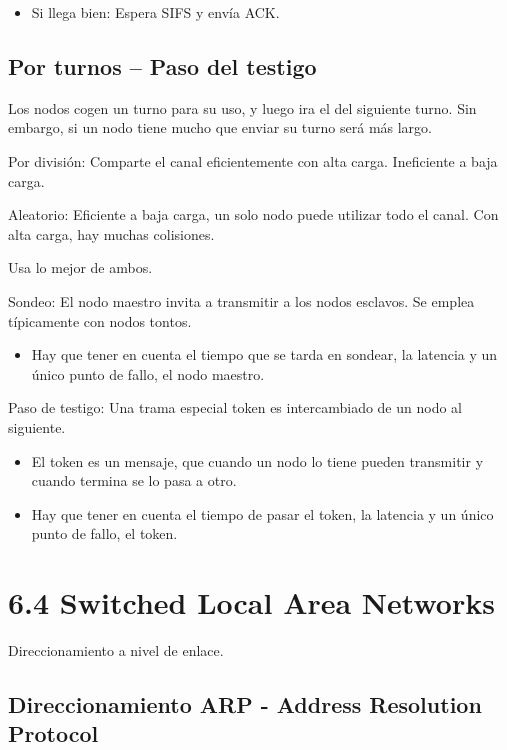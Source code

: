 \documentclass[12pt, twoside, openright]{report} %
\begin{document}
\begin{itemize}
\begin{itemize}
		            \begin{itemize}
			            \item Si llega bien: Espera SIFS y envía ACK.
		            \end{itemize}
	      \end{itemize}
\end{itemize}


\subsection{Por turnos -- Paso del testigo} Los nodos cogen un turno para su
uso, y luego ira el del siguiente turno. Sin embargo, si un nodo
tiene mucho que enviar su turno será más largo.



Por división: Comparte el canal eficientemente con alta carga.
Ineficiente a baja carga.

Aleatorio: Eficiente a baja carga, un solo nodo puede utilizar
todo el canal. Con alta carga, hay muchas colisiones.

Usa lo mejor de ambos.

Sondeo: El nodo maestro invita a transmitir a los nodos
esclavos. Se emplea típicamente con nodos tontos.

\begin{itemize}
	\item Hay que tener en cuenta el tiempo que se tarda en sondear, la
	      latencia y un único punto de fallo, el nodo maestro.
\end{itemize}

Paso de testigo: Una trama especial token es intercambiado de un
nodo al siguiente.

\begin{itemize}
	\item El token es un mensaje, que cuando un nodo lo tiene pueden
	      transmitir y cuando termina se lo pasa a otro.
	\item Hay que tener en cuenta el tiempo de pasar el token, la
	      latencia y un único punto de fallo, el token.
\end{itemize}
\pagebreak

\section{6.4 Switched Local Area Networks}

Direccionamiento a nivel de enlace.

\subsection{Direccionamiento ARP - Address Resolution Protocol}
\end{document}
